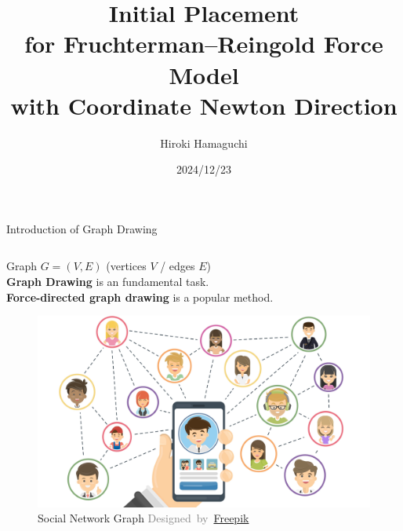 \documentclass[dvipdfmx,13pt,aspectratio=169]{beamer}
\title{\huge{Initial Placement\\for Fruchterman--Reingold Force Model\\with Coordinate Newton Direction}}
\author{\Large{Hiroki Hamaguchi}}
\institute{\large{5th lab}\\\large{Supervisor: Prof. Akiko Takeda}}
\date{2024/12/23}
\newcommand{\gray}[1]{\textcolor{gray}{#1}}
\newif\ifShowHidden
\begin{document}
\ifShowHidden
  \maketitle
\fi

\ifShowHidden
  \section{Introduction}
\fi

\ifShowHidden
  \begin{frame}{Introduction of Graph Drawing}
    \begin{columns}
      \begin{column}{0.58\columnwidth}
        \large{%
          Graph $G = (V,E)$ (vertices $V$  / edges $E$)\\
          \textbf{Graph Drawing} \normalsize{is an fundamental task.}\\
          \textbf{Force-directed graph drawing} \normalsize{is a popular method.}
        }
        \begin{figure}[htbp]
          \centering
          \begin{minipage}{0.55\columnwidth}
            \centering
            \includegraphics[width=\columnwidth]{introExample/social.jpg}
            \caption*{
              Social Network Graph
              \gray{\footnotesize{Designed~by~\href{www.freepik.com}{Freepik}}}
            }
          \end{minipage}%
          \begin{minipage}{0.45\columnwidth}
            \centering

\end{minipage}
\end{figure}
\end{column}
\end{columns}
\end{frame}
\end{document}
